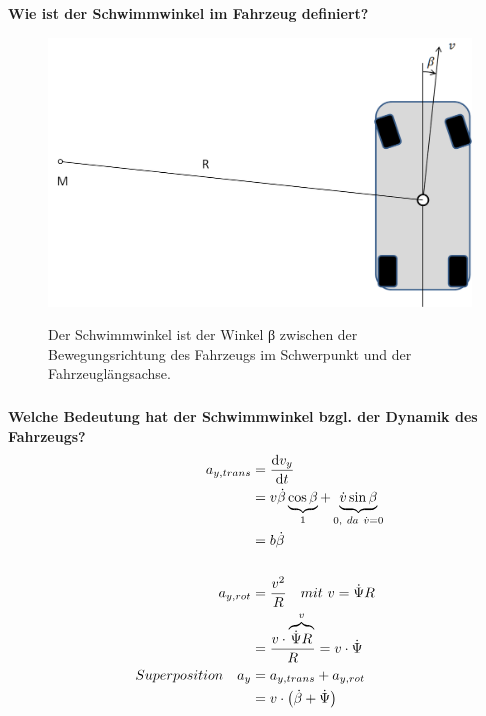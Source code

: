 \subsection{}
\subsubsection{}
\textbf{Wie ist der Schwimmwinkel im Fahrzeug definiert?}
\begin{figure}[H]
    \centering
    \begin{minipage}{.4\linewidth}
        \centering
        \includegraphics[width=\linewidth]{Graphics/Schwimmwinkel.png}
    \end{minipage}
    \begin{minipage}{.55\linewidth}
        Der Schwimmwinkel ist der Winkel β zwischen der Bewegungsrichtung des Fahrzeugs im Schwerpunkt und der Fahrzeuglängsachse.
    \end{minipage}
\end{figure}
\subsubsection{}
\textbf{Welche Bedeutung hat der Schwimmwinkel bzgl. der Dynamik des Fahrzeugs?}
\begin{equation}
    \begin{aligned}
        a_{y,trans} & =\dfrac{\dif v_y}{\dif t}                                                               \\
                    & =v\dot{\beta}\underbrace{\cos\beta}_1+\underbrace{\dot{v}\sin\beta}_{0,\ da\ \dot{v}=0} \\
                    & =b\dot{\beta}                                                                           \\                                                                           \\
        a_{y,rot}   & =\dfrac{v^2}{R}\quad mit\ v=\dot{\Psi}R                                                 \\
                    & =\dfrac{v\cdot\overbrace{\dot{\Psi}R}^v}{R}=v\cdot\dot{\Psi}                            \\
        Superposition\quad a_y&=a_{y,trans}+a_{y,rot}\\
        &=v\cdot\left(\dot{\beta}+\dot{\Psi}\right)
    \end{aligned}
\end{equation}

